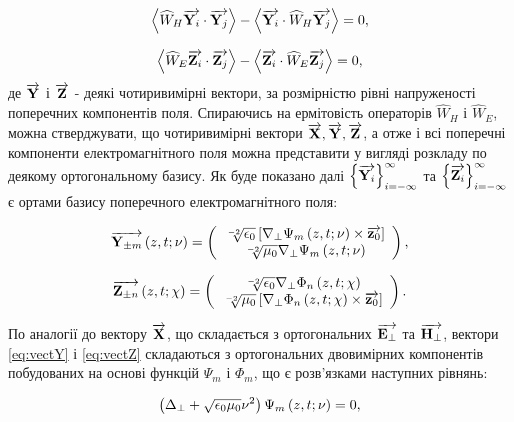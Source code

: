 \begin{equation}
\left< \widehat{W}_H \overrightarrow{\mathbf Y_i} \cdot \overrightarrow{\mathbf Y_j} \right> -
\left< \overrightarrow{\mathbf Y_i} \cdot \widehat{W}_H \overrightarrow{\mathbf Y_j} \right> = 0,
\end{equation}

\begin{equation}
\left< \widehat{W}_E \overrightarrow{\mathbf Z_i} \cdot \overrightarrow{\mathbf Z_j} \right> -
\left< \overrightarrow{\mathbf Z_i} \cdot \widehat{W}_E \overrightarrow{\mathbf Z_j} \right> = 0,
\end{equation}
%
де $ \overrightarrow{\mathbf Y} $ і $ \overrightarrow{\mathbf Z} $ - деякі чотиривимірні вектори, за розмірністю 
рівні напруженості поперечних компонентів поля. Спираючись на ермітовість 
операторів $ \widehat{W}_H $ і $ \widehat{W}_E $, можна стверджувати, що 
чотиривимірні вектори $ \overrightarrow{\mathbf X}, \overrightarrow{\mathbf Y}, \overrightarrow{\mathbf Z} $, а отже і всі поперечні 
компоненти електромагнітного поля можна представити у вигляді розкладу по 
деякому ортогональному базису. Як буде показано далі
$ \left\{ \overrightarrow{\mathbf Y_i} \right\}_{i=-\infty}^\infty $ та 
$ \left\{ \overrightarrow{\mathbf Z_i} \right\}_{i=-\infty}^\infty $ є ортами базису 
поперечного електромагнітного поля:

\begin{equation} \label{eq:vectY}
\overrightarrow{\mathbf Y_{\pm m}} \left( z,t;\nu \right) =
\left( \begin{array}{c} 
\sqrt[-2]{\epsilon_0} 
\left[ \nabla_\perp \Psi_m \left( z,t;\nu \right) \times \overrightarrow{\mathbf z_0} \right] \\ 
\sqrt[-2]{\mu_0} \nabla_\perp \Psi_m \left( z,t;\nu \right) \\ 
\end{array} \right),
\end{equation}

\begin{equation} \label{eq:vectZ}
\overrightarrow{\mathbf Z_{\pm n}} \left( z,t;\chi \right) =
\left( \begin{array}{c} 
\sqrt[-2]{\epsilon_0} \nabla_\perp \Phi_n \left( z,t;\chi \right) \\ 
\sqrt[-2]{\mu_0} \left[ \nabla_\perp \Phi_n \left( z,t;\chi \right) \times \overrightarrow{\mathbf z_0} \right] \\ 
\end{array} \right).
\end{equation}

По аналогії до вектору $ \overrightarrow{\mathbf X} $, що складається з ортогональних 
$ \overrightarrow{\mathbf E_\perp} $ та $ \overrightarrow{\mathbf H_\perp} $, вектори \eqref{eq:vectY} і 
\eqref{eq:vectZ} складаються з ортогональних двовимірних компонентів 
побудованих на основі функцій $ \Psi_m $ і $ \Phi_m $, що є розв'язками
наступних рівнянь:

\begin{equation} \label{eq:equation_psi}
\left( \Delta_\perp + \sqrt{\epsilon_0 \mu_0} \nu^2 \right) 
\Psi_m \left( z,t;\nu \right) = 0,
\end{equation}

